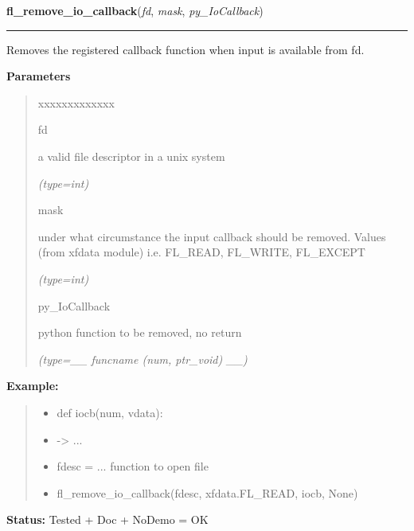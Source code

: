 \hspace{.8\funcindent}\begin{boxedminipage}{\funcwidth}

    \raggedright \textbf{fl\_remove\_io\_callback}(\textit{fd}, \textit{mask}, \textit{py\_IoCallback})

    \vspace{-1.5ex}

    \rule{\textwidth}{0.5\fboxrule}
\setlength{\parskip}{2ex}
    Removes the registered callback function when input is available from 
    fd.

\setlength{\parskip}{1ex}
      \textbf{Parameters}
      \vspace{-1ex}

      \begin{quote}
        \begin{Ventry}{xxxxxxxxxxxxx}

          \item[fd]

          a valid file descriptor in a unix system

            {\it (type=int)}

          \item[mask]

          under what circumstance the input callback should be removed. 
          Values (from xfdata module) i.e. FL\_READ, FL\_WRITE, FL\_EXCEPT

            {\it (type=int)}

          \item[py\_IoCallback]

          python function to be removed, no return

            {\it (type=\_\_ funcname (num, ptr\_void) \_\_)}

        \end{Ventry}

      \end{quote}

\textbf{Example:}
\begin{quote}
  \begin{itemize}

  \item
    \setlength{\parskip}{0.6ex}
def iocb(num, vdata):



  \item {\textbar}-{\textgreater}{\textbar} ...



  \item fdesc = ... function to open file



  \item fl\_remove\_io\_callback(fdesc, xfdata.FL\_READ, iocb, None)



\end{itemize}

\end{quote}

\textbf{Status:} Tested + Doc + NoDemo = OK



    \end{boxedminipage}

